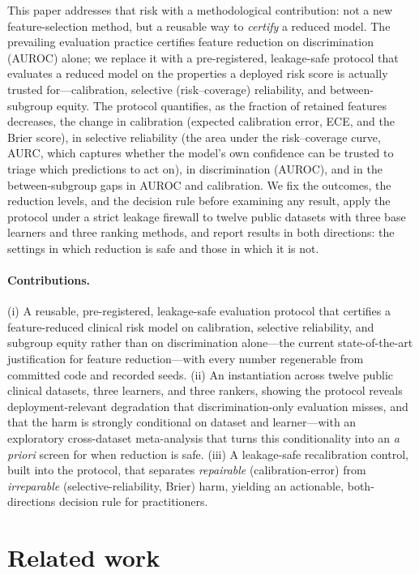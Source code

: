 \documentclass[fleqn,10pt]{wlscirep}
\begin{document}
This paper addresses that risk with a methodological contribution: not a new feature-selection
method, but a reusable way to \emph{certify} a reduced model. The prevailing evaluation practice
certifies feature reduction on discrimination (AUROC) alone; we replace it with a pre-registered,
leakage-safe protocol that evaluates a reduced model on the properties a deployed risk score is
actually trusted for---calibration, selective (risk--coverage) reliability, and between-subgroup
equity. The protocol quantifies, as the fraction of retained features decreases, the change in
calibration (expected calibration error, ECE, and the Brier score), in selective reliability (the area
under the risk--coverage curve, AURC, which captures whether the model's own confidence can be trusted
to triage which predictions to act on), in discrimination (AUROC), and in the between-subgroup gaps in
AUROC and calibration. We fix the outcomes, the reduction levels, and the decision rule before
examining any result, apply the protocol under a strict leakage firewall to twelve public datasets with
three base learners and three ranking methods, and report results in both directions: the settings in
which reduction is safe and those in which it is not.

\paragraph{Contributions.}
(i) A reusable, pre-registered, leakage-safe evaluation protocol that certifies a feature-reduced
clinical risk model on calibration, selective reliability, and subgroup equity rather than on
discrimination alone---the current state-of-the-art justification for feature reduction---with every
number regenerable from committed code and recorded seeds. (ii) An instantiation across twelve public
clinical datasets, three learners, and three rankers, showing the protocol reveals deployment-relevant
degradation that discrimination-only evaluation misses, and that the harm is strongly conditional on
dataset and learner---with an exploratory cross-dataset meta-analysis that turns this conditionality
into an \emph{a priori} screen for when reduction is safe. (iii) A leakage-safe recalibration control, built into the protocol, that
separates \emph{repairable} (calibration-error) from \emph{irreparable} (selective-reliability,
Brier) harm, yielding an actionable, both-directions decision rule for practitioners.

\section{Related work}
\label{sec:related}
\end{document}
